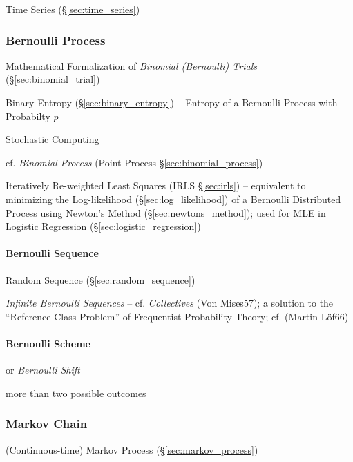 \fist Time Series (\S\ref{sec:time_series})




\subsubsection{Bernoulli Process}\label{sec:bernoulli_process}

Mathematical Formalization of \emph{Binomial (Bernoulli) Trials}
(\S\ref{sec:binomial_trial})

Binary Entropy (\S\ref{sec:binary_entropy}) -- Entropy of a Bernoulli Process
with Probabilty $p$

Stochastic Computing

cf. \emph{Binomial Process} (Point Process \S\ref{sec:binomial_process})

Iteratively Re-weighted Least Squares (IRLS \S\ref{sec:irls}) -- equivalent to
minimizing the Log-likelihood (\S\ref{sec:log_likelihood}) of a Bernoulli
Distributed Process using Newton's Method (\S\ref{sec:newtons_method}); used for
MLE in Logistic Regression (\S\ref{sec:logistic_regression})



\paragraph{Bernoulli Sequence}\label{sec:bernoulli_sequence}\hfill

Random Sequence (\S\ref{sec:random_sequence})

\emph{Infinite Bernoulli Sequences} -- cf. \emph{Collectives} (Von Mises57); a
solution to the ``Reference Class Problem'' of Frequentist Probability Theory;
cf. (Martin-L\"of66)



\paragraph{Bernoulli Scheme}\label{sec:bernoulli_scheme}\hfill

or \emph{Bernoulli Shift}

more than two possible outcomes



\subsubsection{Markov Chain}\label{sec:markov_chain}

\fist (Continuous-time) Markov Process (\S\ref{sec:markov_process})

